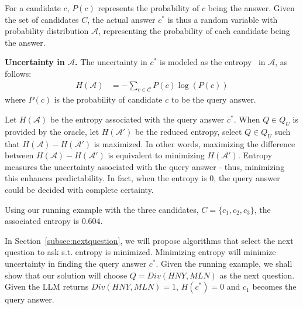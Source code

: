 
For a candidate $c$,  $P(c)$ represents the probability of $c$ being the answer. Given the set of candidates $C$, the actual answer $c^*$ is thus a random variable with probability distribution $\mathcal{A}$, representing the probability of each candidate being the answer.
 \begin{definition}
     {\bf Uncertainty in $\mathcal{A}$.} The uncertainty in $c^*$ is modeled as the entropy~\cite{renyi1961measures} in $\mathcal{A}$, as follows:
    \begin{align*}
    H(\mathcal{A}) &= - \sum_{c \in \mathcal{C}} P(c) \log(P(c))
\end{align*}
where $P(c)$ is the probability of candidate $c$ to be the query answer. 
 \end{definition}

 Let $H(\mathcal{A})$ be the entropy associated with the query answer $c^*$. When $Q \in Q_U$ is provided by the oracle, let $H(\mathcal{A'})$ be the reduced entropy, select $Q \in Q_U$ such that $H(\mathcal{A}) - H(\mathcal{A'})$ is maximized. In other words, maximizing the difference between $H(\mathcal{A}) - H(\mathcal{A'})$ is equivalent to minimizing  $H(\mathcal{A'})$. Entropy measures the uncertainty associated with the query answer - thus, minimizing this enhances predictability. In fact, when the entropy is $0$, the query answer could be decided with complete certainty.

Using our running example with the three candidates, $C = \{c_1, c_2, c_3\}$, the associated entropy is $0.604$.

\begin{comment}
    \begin{align*}
    H(\mathcal{A}) &= - (p_{c_1} \log(p_{c_1}) + p_{c_2} \log(p_{c_2}) + p_{c_3} \log(p_{c_3}))
    \end{align*}


\[
    H(c^*) \approx \text{0.604}
\]
\end{comment}


In Section~\ref{subsec:nextquestion}, we will propose algorithms that select the next question to ask s.t. entropy is minimized. Minimizing entropy will minimize uncertainty in finding the query answer $c^*$. Given the running example, we shall show that our solution will choose $Q = Div(HNY, MLN)$ as the next question. Given the LLM returns $Div(HNY, MLN) = 1$, $H(c^*) = 0$ and $c_1$ becomes the query answer.



